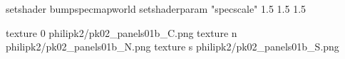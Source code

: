 setshader bumpspecmapworld
setshaderparam "specscale" 1.5 1.5 1.5

texture 0 philipk2/pk02_panels01b_C.png
texture n philipk2/pk02_panels01b_N.png
texture s philipk2/pk02_panels01b_S.png

